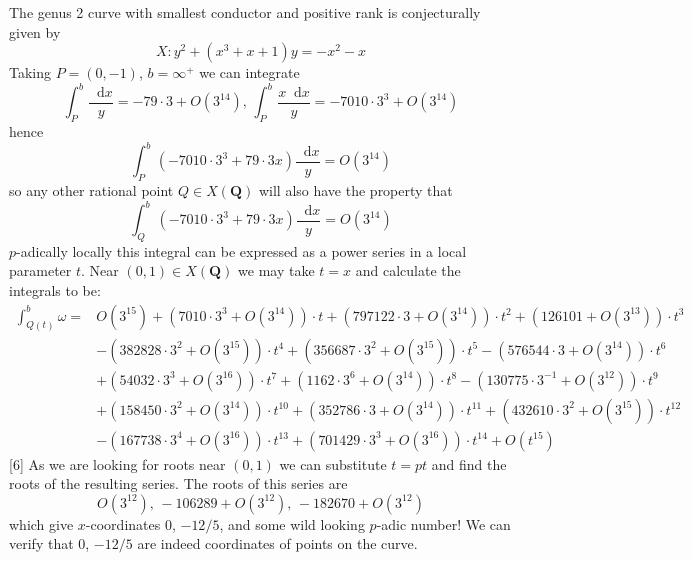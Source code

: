 \documentclass[oneside,11pt,]{article}
\newcommand{\diff}{\mathop{}\!\mathrm{d}}
\begin{document}
    The genus 2 curve with smallest conductor and positive rank is conjecturally given by
    \[X \colon y^2 + (x^3 + x + 1)y = -x^2 - x\]
    Taking $P = (0, -1)$, $b = \infty^+$ we can integrate
    \[\int^b_P \frac{\diff x }y = -79\cdot3 + O(3^{14}) ,\, \int^b_P \frac{x\diff x }y =  -7010\cdot3^3 + O(3^{14})\]
    hence
    \[\int^b_P  (-7010\cdot3^3 + 79\cdot3 x )\frac{\diff x }y  = O(3^{14})\]
    so any other rational point $Q \in X(\mathbf Q)$ will also have the property that
    \[\int^b_Q  (-7010\cdot3^3 + 79\cdot3 x)\frac{\diff x }y  = O(3^{14})\]
    $p$-adically locally this integral can be expressed as a power series in a local parameter $t$.
    Near $(0,1) \in X(\mathbf Q)$ we may take $t =x $ and calculate the integrals to be:
    \begin{align*}
        \int^b_{Q(t)} \omega =& O(3^{15}) + (7010\cdot3^3 + O(3^{14}))\cdot t + (797122\cdot3 + O(3^{14}))\cdot t^2 + (126101 + O(3^{13}))\cdot t^3 \\ & - (382828\cdot3^2 + O(3^{15}))\cdot t^4 + (356687\cdot3^2 + 
        O(3^{15}))\cdot t^5 - (576544\cdot3 + O(3^{14}))\cdot t^6 \\ & + (54032\cdot3^3 + O(3^{16}))\cdot t^7 + (1162\cdot3^6 + O(3^{14}))\cdot t^8 - (130775\cdot3^{-1} + O(3^{12}))\cdot t^9 \\&+ 
        (158450\cdot3^2 + O(3^{14}))\cdot t^{10} + (352786\cdot3 + O(3^{14}))\cdot t^{11} + (432610\cdot3^2 + O(3^{15}))\cdot t^{12} \\ &- (167738\cdot3^4 + O(3^{16}))\cdot t^{13} + (701429\cdot3^3 + O(3^{16}))\cdot t^{14} + O(t^{15})
\end{align*}
    [6]
    As we are looking for roots near $(0,1)$ we can substitute $t = pt$ and find the roots of the resulting series.
    The roots of this series are
    \[  O(3^{12}),\,-106289 + O(3^{12}),\,-182670 + O(3^{12}) \]
    which give $x$-coordinates $0$, $-12/5$, and some wild looking $p$-adic number!
    We can verify that $0$, $-12/5$ are indeed coordinates of points on the curve.
\end{document}
